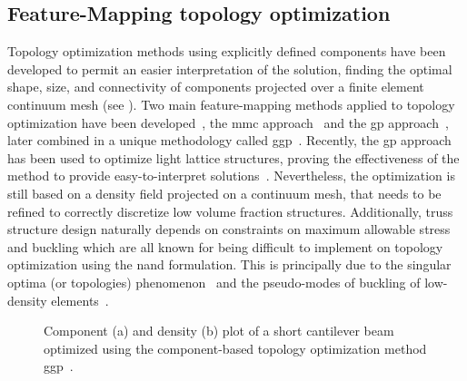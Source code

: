\subsection{Feature-Mapping topology optimization}
Topology optimization methods using explicitly defined components have been developed to permit an easier interpretation of the solution, finding the optimal shape, size, and connectivity of components projected over a finite element continuum mesh (see ). Two main feature-mapping methods applied to topology optimization have been developed~, the \gls{mmc} approach~
and the \gls{gp} approach~, later combined in a unique methodology called \gls{ggp}~. Recently, the \gls{gp} approach has been used to optimize light lattice structures, proving the effectiveness of the method to provide easy-to-interpret solutions~. Nevertheless, the optimization is still based on a density field projected on a continuum mesh, that needs to be refined to correctly discretize low volume fraction structures. Additionally, truss structure design naturally depends on constraints on maximum allowable stress and buckling which are all known for being difficult to implement on topology optimization using the \gls{nand} formulation. This is principally due to the singular optima (or topologies) phenomenon~ and the pseudo-modes of buckling of low-density elements~. \begin{figure}
    \hspace*{\fill}
    \hfill
    \hspace*{\fill}
    \caption{Component (a) and density (b) plot of a short cantilever beam optimized using the component-based topology optimization method \gls{ggp}~\cite{coniglio_generalized_2020}.}
    \label{fig:03_to_component}
\end{figure}


